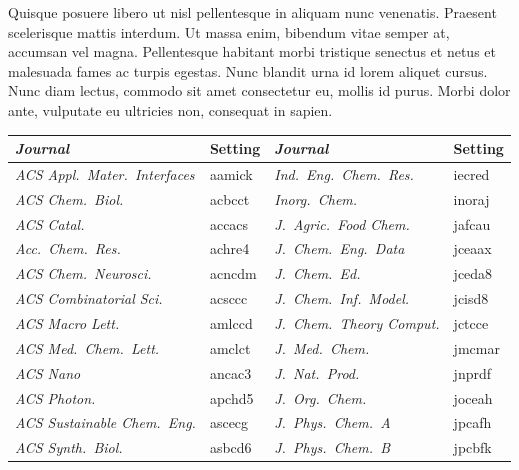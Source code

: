 \documentclass[english,journal=jctcce,manuscript=article,etalmode=truncate,maxauthors=0]{achemso}
\begin{document}
Quisque posuere libero ut nisl pellentesque in aliquam nunc venenatis. Praesent scelerisque mattis interdum. Ut massa enim, bibendum vitae semper at, accumsan vel magna. Pellentesque habitant morbi tristique senectus et netus et malesuada fames ac turpis egestas. Nunc blandit urna id lorem aliquet cursus. Nunc diam lectus, commodo sit amet consectetur eu, mollis id purus. Morbi dolor ante, vulputate eu ultricies non, consequat in sapien.

\begin{table}
  \centering
  \begin{tabular}{@{}>{\itshape}l>{\ttfamily}l>{\itshape}l>{\ttfamily}l@{}}
    \toprule
      Journal & \rmfamily Setting & Journal & \rmfamily Setting \\
    \midrule
      ACS Appl.\ Mater.\ Interfaces   & aamick &
      Ind.\ Eng.\ Chem.\ Res.         & iecred \\
      ACS Chem.\ Biol.                & acbcct &
      Inorg.\ Chem.                   & inoraj \\
      ACS Catal.                      & accacs &
      J.~Agric.\ Food Chem.           & jafcau \\
      Acc.\ Chem.\ Res.               & achre4 &
      J.~Chem.\ Eng.\ Data            & jceaax \\
      ACS Chem.\ Neurosci.            & acncdm &
      J.~Chem.\ Ed.                   & jceda8 \\
      ACS Combinatorial Sci.          & acsccc &
      J.~Chem.\ Inf.\ Model.          & jcisd8 \\
      ACS Macro Lett.                 & amlccd &
      J.~Chem.\ Theory Comput.        & jctcce \\
      ACS Med.\ Chem.\ Lett.          & amclct &
      J.~Med.\ Chem.                  & jmcmar \\
      ACS Nano                        & ancac3 &
      J.~Nat.\ Prod.                  & jnprdf \\
      ACS Photon.                     & apchd5 &
      J.~Org.\ Chem.                  & joceah \\
      ACS Sustainable Chem.\ Eng.     & ascecg &
      J.~Phys.\ Chem.~A               & jpcafh \\
      ACS Synth.\ Biol.               & asbcd6 &
      J.~Phys.\ Chem.~B               & jpcbfk \\

\end{tabular}
\end{table}
\end{document}

